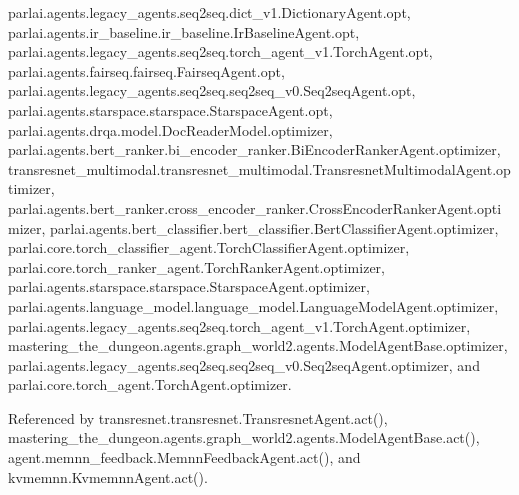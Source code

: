 parlai.\+agents.\+legacy\+\_\+agents.\+seq2seq.\+dict\+\_\+v1.\+Dictionary\+Agent.\+opt, parlai.\+agents.\+ir\+\_\+baseline.\+ir\+\_\+baseline.\+Ir\+Baseline\+Agent.\+opt, parlai.\+agents.\+legacy\+\_\+agents.\+seq2seq.\+torch\+\_\+agent\+\_\+v1.\+Torch\+Agent.\+opt, parlai.\+agents.\+fairseq.\+fairseq.\+Fairseq\+Agent.\+opt, parlai.\+agents.\+legacy\+\_\+agents.\+seq2seq.\+seq2seq\+\_\+v0.\+Seq2seq\+Agent.\+opt, parlai.\+agents.\+starspace.\+starspace.\+Starspace\+Agent.\+opt, parlai.\+agents.\+drqa.\+model.\+Doc\+Reader\+Model.\+optimizer, parlai.\+agents.\+bert\+\_\+ranker.\+bi\+\_\+encoder\+\_\+ranker.\+Bi\+Encoder\+Ranker\+Agent.\+optimizer, transresnet\+\_\+multimodal.\+transresnet\+\_\+multimodal.\+Transresnet\+Multimodal\+Agent.\+optimizer, parlai.\+agents.\+bert\+\_\+ranker.\+cross\+\_\+encoder\+\_\+ranker.\+Cross\+Encoder\+Ranker\+Agent.\+optimizer, parlai.\+agents.\+bert\+\_\+classifier.\+bert\+\_\+classifier.\+Bert\+Classifier\+Agent.\+optimizer, parlai.\+core.\+torch\+\_\+classifier\+\_\+agent.\+Torch\+Classifier\+Agent.\+optimizer, parlai.\+core.\+torch\+\_\+ranker\+\_\+agent.\+Torch\+Ranker\+Agent.\+optimizer, parlai.\+agents.\+starspace.\+starspace.\+Starspace\+Agent.\+optimizer, parlai.\+agents.\+language\+\_\+model.\+language\+\_\+model.\+Language\+Model\+Agent.\+optimizer, parlai.\+agents.\+legacy\+\_\+agents.\+seq2seq.\+torch\+\_\+agent\+\_\+v1.\+Torch\+Agent.\+optimizer, mastering\+\_\+the\+\_\+dungeon.\+agents.\+graph\+\_\+world2.\+agents.\+Model\+Agent\+Base.\+optimizer, parlai.\+agents.\+legacy\+\_\+agents.\+seq2seq.\+seq2seq\+\_\+v0.\+Seq2seq\+Agent.\+optimizer, and parlai.\+core.\+torch\+\_\+agent.\+Torch\+Agent.\+optimizer.



Referenced by transresnet.\+transresnet.\+Transresnet\+Agent.\+act(), mastering\+\_\+the\+\_\+dungeon.\+agents.\+graph\+\_\+world2.\+agents.\+Model\+Agent\+Base.\+act(), agent.\+memnn\+\_\+feedback.\+Memnn\+Feedback\+Agent.\+act(), and kvmemnn.\+Kvmemnn\+Agent.\+act().

